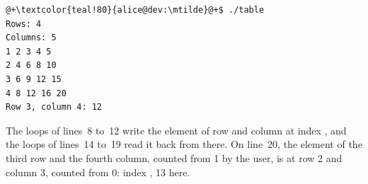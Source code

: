 
\vspace{-10pt}%
\begin{lstlisting}[style=bashVerb, escapechar=@+]
@+\textcolor{teal!80}{alice@dev:\mtilde}@+$ ./table
Rows: 4
Columns: 5
1 2 3 4 5
2 4 6 8 10
3 6 9 12 15
4 8 12 16 20
Row 3, column 4: 12
\end{lstlisting}

The loops of lines~8 to~12 write the element of row  and column
 at index , and the loops of lines~14 to~19 read it
back from there. On line~20, the element of the third row and the fourth
column, counted from 1 by the user, is at row 2 and column 3, counted from 0:
index , 13 here.

